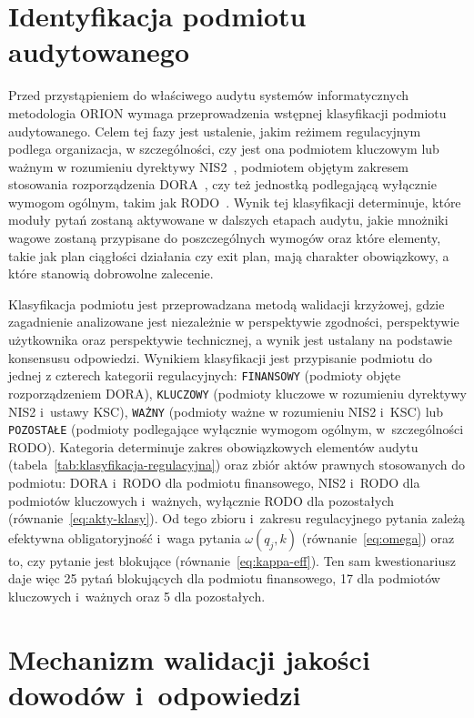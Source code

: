 \section{Identyfikacja podmiotu audytowanego}
\label{sec:kim-jestem}

Przed przystąpieniem do właściwego audytu systemów informatycznych
metodologia ORION wymaga przeprowadzenia wstępnej klasyfikacji
podmiotu audytowanego. Celem tej fazy jest ustalenie, jakim
reżimem regulacyjnym podlega organizacja, w szczególności,
czy jest ona podmiotem kluczowym lub ważnym w rozumieniu dyrektywy NIS2~\autocite{dyrektywa_nis2}, podmiotem objętym zakresem stosowania rozporządzenia DORA~\autocite{dora2022}, czy też
jednostką podlegającą wyłącznie wymogom ogólnym, takim jak RODO~\autocite{rodo}. Wynik tej klasyfikacji determinuje, które moduły pytań zostaną aktywowane w dalszych etapach
audytu, jakie mnożniki wagowe zostaną przypisane do poszczególnych wymogów oraz które elementy, takie jak
plan ciągłości działania czy exit plan, mają charakter obowiązkowy, a które stanowią dobrowolne zalecenie.


Klasyfikacja podmiotu jest przeprowadzana metodą walidacji krzyżowej, gdzie zagadnienie analizowane jest niezależnie w perspektywie
zgodności, perspektywie użytkownika oraz perspektywie technicznej, a wynik jest ustalany na podstawie konsensusu odpowiedzi.
Wynikiem klasyfikacji jest przypisanie podmiotu do jednej z czterech kategorii regulacyjnych: \texttt{FINANSOWY} (podmioty objęte rozporządzeniem DORA), \texttt{KLUCZOWY} (podmioty kluczowe w rozumieniu dyrektywy NIS2 i~ustawy KSC), \texttt{WAŻNY} (podmioty ważne w rozumieniu NIS2 i~KSC) lub \texttt{POZOSTAŁE} (podmioty podlegające wyłącznie wymogom ogólnym, w~szczególności RODO). Kategoria determinuje zakres obowiązkowych elementów audytu (tabela~\ref{tab:klasyfikacja-regulacyjna}) oraz zbiór aktów prawnych stosowanych do podmiotu: DORA i~RODO dla podmiotu finansowego, NIS2 i~RODO dla podmiotów kluczowych i~ważnych, wyłącznie RODO dla pozostałych (równanie~\eqref{eq:akty-klasy}). Od tego zbioru i~zakresu regulacyjnego pytania zależą efektywna obligatoryjność i~waga pytania $\omega(q_j, k)$ (równanie~\eqref{eq:omega}) oraz to, czy pytanie jest blokujące (równanie~\eqref{eq:kappa-eff}). Ten sam kwestionariusz daje więc 25 pytań blokujących dla podmiotu finansowego, 17 dla podmiotów kluczowych i~ważnych oraz 5 dla pozostałych.
\section{Mechanizm walidacji jakości dowodów i~odpowiedzi}

